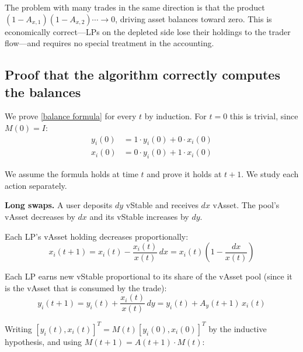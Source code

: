 \documentclass{article}
\begin{document}
The problem with many trades in the same direction is that the product
$(1 - A_{x,1})(1 - A_{x,2}) \cdots \to 0$, driving asset balances toward zero. This is
economically correct---LPs on the depleted side lose their holdings to the trader
flow---and requires no special treatment in the accounting.

\subsection{Proof that the algorithm correctly computes the balances}

We prove \eqref{balance formula} for every $t$ by induction. For $t = 0$ this is trivial,
since $M(0) = I$:
\begin{align}
y_i(0) &= 1 \cdot y_i(0) + 0 \cdot x_i(0) \\
x_i(0) &= 0 \cdot y_i(0) + 1 \cdot x_i(0)
\end{align}

We assume the formula holds at time $t$ and prove it holds at $t+1$. We study each
action separately.

\medskip
\noindent\textbf{Long swaps.} A user deposits $dy$ vStable and receives $dx$ vAsset. The
pool's vAsset decreases by $dx$ and its vStable increases by $dy$.

Each LP's vAsset holding decreases proportionally:
\begin{equation}
x_i(t+1) = x_i(t) - \frac{x_i(t)}{x(t)}\,dx = x_i(t)\!\left(1 - \frac{dx}{x(t)}\right)
\end{equation}

Each LP earns new vStable proportional to its share of the vAsset pool (since it is the
vAsset that is consumed by the trade):
\begin{equation}
y_i(t+1) = y_i(t) + \frac{x_i(t)}{x(t)}\,dy = y_i(t) + A_y(t+1)\,x_i(t)
\end{equation}

Writing $[y_i(t), x_i(t)]^T = M(t)[y_i(0), x_i(0)]^T$ by the inductive hypothesis, and
using $M(t+1) = A(t+1)\cdot M(t)$:
\end{document}

